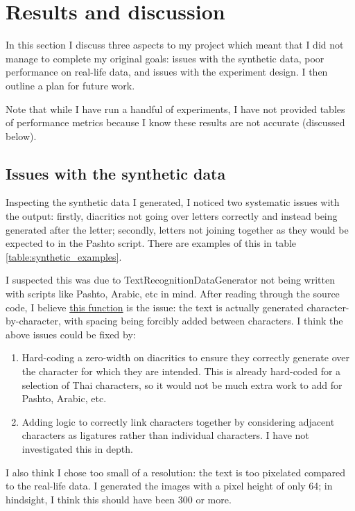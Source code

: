 \documentclass[twocolumn,11pt]{extarticle}
\begin{document}
\section{Results and discussion}
In this section I discuss three aspects to my project which meant that I did not manage to complete my original goals: issues with the synthetic data, poor performance on real-life data, and issues with the experiment design. I then outline a plan for future work. 

Note that while I have run a handful of experiments, I have not provided tables of performance metrics because I know these results are not accurate (discussed below). 

\subsection{Issues with the synthetic data}

Inspecting the synthetic data I generated, I noticed two systematic issues with the output: firstly, diacritics not going over letters correctly and instead being generated after the letter; secondly, letters not joining together as they would be expected to in the Pashto script. There are examples of this in table \ref{table:synthetic_examples}. 

I suspected this was due to TextRecognitionDataGenerator not being written with scripts like Pashto, Arabic, etc in mind. After reading through the source code, I believe \href{https://github.com/Belval/TextRecognitionDataGenerator/blob/master/trdg/computer_text_generator.py#L74}{this function} is the issue: the text is actually generated character-by-character, with spacing being forcibly added between characters. I think the above issues could be fixed by:
\begin{enumerate}
    \item Hard-coding a zero-width on diacritics to ensure they correctly generate over the character for which they are intended. This is already hard-coded for a selection of Thai characters, so it would not be much extra work to add for Pashto, Arabic, etc.
    \item Adding logic to correctly link characters together by considering adjacent characters as ligatures rather than individual characters. I have not investigated this in depth.
\end{enumerate}

I also think I chose too small of a resolution: the text is too pixelated compared to the real-life data. I generated the images with a pixel height of only 64; in hindsight, I think this should have been 300 or more. 
\end{document}

